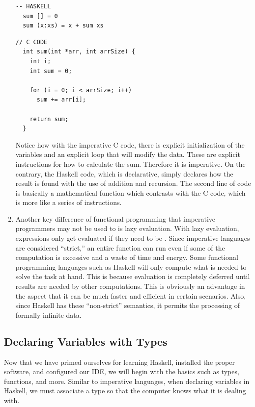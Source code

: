 \documentclass{article}
\begin{document}
\begin{enumerate}
  \begin{lstlisting}[style=HaskellStyle]
  -- HASKELL
  sum [] = 0
  sum (x:xs) = x + sum xs
  \end{lstlisting}

  \begin{lstlisting}[style=CStyle]
  // C CODE
  int sum(int *arr, int arrSize) {
    int i;
    int sum = 0;
  
    for (i = 0; i < arrSize; i++)
      sum += arr[i];
  
    return sum;
  }
  \end{lstlisting}

  Notice how with the imperative C code, there is explicit initialization of the variables and an explicit loop that will modify the data. These are explicit instructions for how to calculate the sum. Therefore it is imperative. On the contrary, the Haskell code, which is declarative, simply declares how the result is found with the use of addition and recursion. The second line of code is basically a mathematical function which contrasts with the C code, which is more like a series of instructions.

  \item Another key difference of functional programming that imperative programmers may not be used to is lazy evaluation. With lazy evaluation, expressions only get evaluated if they need to be \cite{LE}. Since imperative languages are considered “strict,” an entire function can run even if some of the computation is excessive and a waste of time and energy. Some functional programming languages such as Haskell will only compute what is needed to solve the task at hand. This is because evaluation is completely deferred until results are needed by other computations. This is obviously an advantage in the aspect that it can be much faster and efficient in certain scenarios. Also, since Haskell has these “non-strict” semantics, it permits the processing of formally infinite data. 
\end{enumerate}

\subsection{Declaring Variables with Types}
\medskip\noindent
Now that we have primed ourselves for learning Haskell, installed the proper software, and configured our IDE, we will begin with the basics such as types, functions, and more. Similar to imperative languages, when declaring variables in Haskell, we must associate a type so that the computer knows what it is dealing with. 
\end{document}
